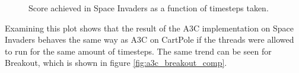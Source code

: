\documentclass[11pt]{article}
\begin{document}
\begin{figure}[H]
    \caption{Score achieved in Space Invaders as a function of
    timesteps taken.}
    \label{fig:a3c_spaceinvaders_ts}
\end{figure}

Examining this plot shows that the result of the A3C implementation
on Space Invaders behaves the same way as A3C on CartPole if the threads
were allowed to run for the same amount of timesteps.
The same trend can be seen for Breakout, which is shown in figure
\ref{fig:a3c_breakout_comp}.
\end{document}
